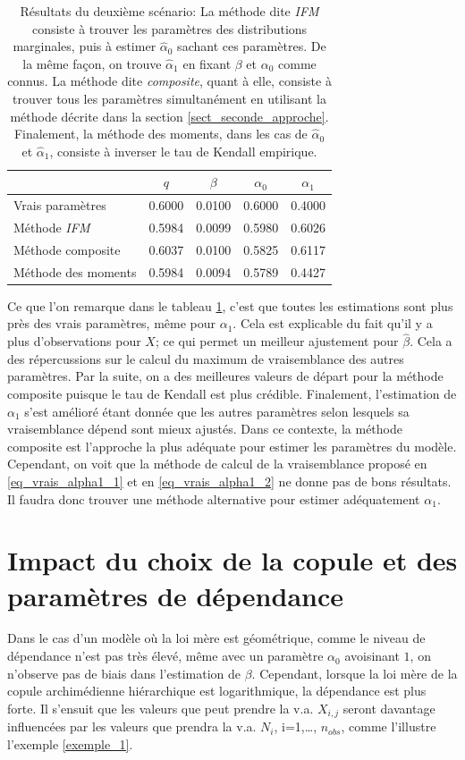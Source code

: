\documentclass[11pt]{article}
\begin{document}
 	 \begin{table}[H]
 		\centering
 		\begin{tabular}{lcccc}
 			\hline
 			& $q$ & $\beta$ & $\alpha_0$ & $\alpha_1$ \\ 
 			\hline
 			Vrais paramètres & 0.6000 & 0.0100 & 0.6000 & 0.4000 \\ 
 			Méthode \textit{IFM} & 0.5984 & 0.0099 & 0.5980 & 0.6026 \\ 
 			Méthode composite & 0.6037 & 0.0100 & 0.5825 & 0.6117 \\ 
 			Méthode des moments & 0.5984 & 0.0094 & 0.5789 & 0.4427 \\
 			\hline
 		\end{tabular}
 		\caption[Résultats du deuxième scénario.]{Résultats du deuxième scénario: La méthode dite \textit{IFM} consiste à trouver les paramètres des distributions marginales, puis à estimer $\hat{\alpha}_{0}$ sachant ces paramètres. De la même façon, on trouve $\hat{\alpha}_{1}$ en fixant $\beta$ et $\alpha_{0}$ comme connus. La méthode dite \textit{composite}, quant à elle, consiste à trouver tous les paramètres simultanément en utilisant la méthode décrite dans la section \ref{sect_seconde_approche}. Finalement, la méthode des moments, dans les cas de $\hat{\alpha}_{0}$ et $\hat{\alpha}_{1}$, consiste à inverser le tau de Kendall empirique.}
 		\label{tbl_resultats_scenario_2}
 	\end{table}
 	
 	Ce que l'on remarque dans le tableau \ref{tbl_resultats_scenario_2}, c'est que toutes les estimations sont plus près des vrais paramètres, même pour $\alpha_1$. 	
 	Cela est explicable du fait qu'il y a plus d'observations pour $X$; ce qui permet un meilleur ajustement pour $\hat{\beta}$. Cela a des répercussions sur le calcul du maximum de vraisemblance des autres paramètres. Par la suite, on a des meilleures valeurs de départ pour la méthode composite puisque le tau de Kendall est plus crédible. Finalement, l'estimation de $\alpha_1$ s'est amélioré étant donnée que les autres paramètres selon lesquels sa vraisemblance dépend sont mieux ajustés. Dans ce contexte, la méthode composite est l'approche la plus adéquate pour estimer les paramètres du modèle.
 	Cependant, on voit que la méthode de calcul de la vraisemblance proposé en \eqref{eq_vrais_alpha1_1} et en \eqref{eq_vrais_alpha1_2} ne donne pas de bons résultats. Il faudra donc trouver une méthode alternative pour estimer adéquatement $\alpha_1$.
 	
 	\section{Impact du choix de la copule et des paramètres de dépendance}
 		Dans le cas d'un modèle où la loi mère est géométrique, comme le niveau de dépendance n'est pas très élevé, même avec un paramètre $\alpha_0$ avoisinant $1$, on n'observe pas de biais dans l'estimation de $\beta$. Cependant, lorsque la loi mère de la copule archimédienne hiérarchique est logarithmique, la dépendance est plus forte. Il s'ensuit que les valeurs que peut prendre la v.a. $X_{i,j}$ seront davantage influencées par les valeurs que prendra la v.a. $N_i$, i=1,\dots, $n_{obs}$, comme l'illustre l'exemple \ref{exemple_1}.
 		
\end{document}
